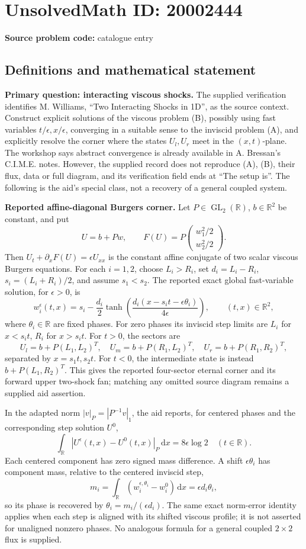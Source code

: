 \documentclass[11pt]{article}
\newcommand{\R}{\mathbb{R}}
\begin{document}
\section*{UnsolvedMath ID: 20002444}
\textbf{Source problem code:} catalogue entry
\subsection{Definitions and mathematical statement}
\textbf{Primary question: interacting viscous shocks.} The supplied verification identifies M. Williams, ``Two Interacting Shocks in 1D'', as the source context. Construct explicit solutions of the viscous problem (B), possibly using fast variables \(t/\epsilon,x/\epsilon\), converging in a suitable sense to the inviscid problem (A), and explicitly resolve the corner where the states \(U_l,U_r\) meet in the \((x,t)\)-plane. The workshop says abstract convergence is already available in A. Bressan's C.I.M.E. notes. However, the supplied record does not reproduce (A), (B), their flux, data or full diagram, and its verification field ends at ``The setup is''. The following is the aid's special class, not a recovery of a general coupled system.

\textbf{Reported affine-diagonal Burgers corner.} Let \(P\in\operatorname{GL}_2(\R)\), \(b\in\R^2\) be constant, and put
\[
 U=b+Pw,\qquad F(U)=P\begin{pmatrix}w_1^2/2\\w_2^2/2\end{pmatrix}.
\]
Then \(U_t+\partial_xF(U)=\epsilon U_{xx}\) is the constant affine conjugate of two scalar viscous Burgers equations. For each \(i=1,2\), choose \(L_i>R_i\), set \(d_i=L_i-R_i\), \(s_i=(L_i+R_i)/2\), and assume \(s_1<s_2\). The reported exact global fast-variable solution, for \(\epsilon>0\), is
\[
 w_i^\epsilon(t,x)=s_i-\frac{d_i}{2}
 \tanh\left(\frac{d_i(x-s_it-\epsilon\theta_i)}{4\epsilon}\right),
 \qquad (t,x)\in\R^2,
\]
where \(\theta_i\in\R\) are fixed phases. For zero phases its inviscid step limits are \(L_i\) for \(x<s_it\), \(R_i\) for \(x>s_it\). For \(t>0\), the sectors are
\[
 U_l=b+P(L_1,L_2)^T,\quad
 U_m=b+P(R_1,L_2)^T,\quad
 U_r=b+P(R_1,R_2)^T,
\]
separated by \(x=s_1t,s_2t\). For \(t<0\), the intermediate state is instead \(b+P(L_1,R_2)^T\). This gives the reported four-sector eternal corner and its forward upper two-shock fan; matching any omitted source diagram remains a supplied aid assertion.

In the adapted norm \(|v|_P=|P^{-1}v|_1\), the aid reports, for centered phases and the corresponding step solution \(U^0\),
\[
 \int_\R|U^\epsilon(t,x)-U^0(t,x)|_P\,\mathrm dx
 =8\epsilon\log2\quad(t\in\R).
\]
Each centered component has zero signed mass difference. A shift \(\epsilon\theta_i\) has component mass, relative to the centered inviscid step,
\[
 m_i=\int_\R(w_i^{\epsilon,\theta_i}-w_i^0)\,\mathrm dx
 =\epsilon d_i\theta_i,
\]
so its phase is recovered by \(\theta_i=m_i/(\epsilon d_i)\). The same exact norm-error identity applies when each step is aligned with its shifted viscous profile; it is not asserted for unaligned nonzero phases. No analogous formula for a general coupled \(2\times2\) flux is supplied.
\end{document}
